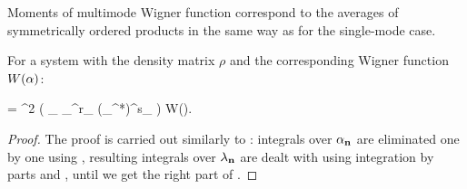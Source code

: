 Moments of multimode Wigner function correspond to the averages of symmetrically ordered products in the same way as for the single-mode case.

\begin{theorem}
	For a system with the density matrix $\rho$ and the corresponding Wigner function $W(\mathbf{\alpha})$:
	\begin{eqn*}
		\langle {} \rangle
		= \int \upd^2 \balpha
			\left(
				\prod_{\nvec \in \restbasis} \alpha_{\nvec}^{r_{\nvec}} (\alpha_{\nvec}^*)^{s_{\nvec}}
			\right) W(\balpha).
	\end{eqn*}
\end{theorem}
\begin{proof}
The proof is carried out similarly to : integrals over $\alpha_{\mathbf{n}}$ are eliminated one by one using , resulting integrals over $\lambda_{\mathbf{n}}$ are dealt with using integration by parts and , until we get the right part of .
\end{proof}
